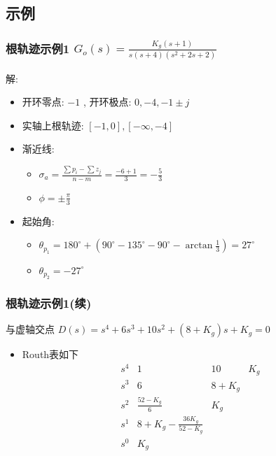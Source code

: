 \documentclass{article}
\begin{document}
\subsection{示例}
\label{sec-2-2}
\begin{frame}
\frametitle{根轨迹示例1 $G_o(s) = \frac{K_g(s+1)}{s(s+4)(s^2+2s+2)}$}
\label{sec-2-2-1}


解:
\begin{itemize}
\item <2->开环零点: $-1$ , 开环极点: $0,-4,-1\pm j$
\item <3->实轴上根轨迹:  $[-1,0],[-\infty,-4]$
\item <4->渐近线:
\begin{itemize}
\item $\sigma_a=\frac{\sum p_i-\sum z_j}{n-m}=\frac{-6+1}{3}=-\frac{5}{3}$
\item $\phi=\pm\frac{\pi}{3}$
\end{itemize}
\item <5->起始角:
\begin{itemize}
\item $\theta_{p_1}=180^{\circ}+(90^{\circ}-135^{\circ}-90^{\circ}-\arctan\frac{1}{3})=27^{\circ}$
\item $\theta_{p_2}=-27^{\circ}$
\end{itemize}
\end{itemize}
\end{frame}
\begin{frame}
\frametitle{根轨迹示例1(续)}
\label{sec-2-2-2}

  与虚轴交点  $D(s)=s^4+6s^3+10s^2+(8+K_g)s+K_g =0$ 
\begin{itemize}

\item Routh表如下\\
\label{sec-2-2-2-1}%
\[\begin{matrix}
       	s^4 & 1 & 10 & K_g \\
       	s^3 & 6 & 8+K_g \\
       	s^2 & \frac{52-K_g}{6} & K_g \\
       	s^1 & 8+K_g-\frac{36K_g}{52-K_g} \\
       	s^0 & K_g
       	\end{matrix}\]

\end{itemize} %
\end{frame}
\end{document}
